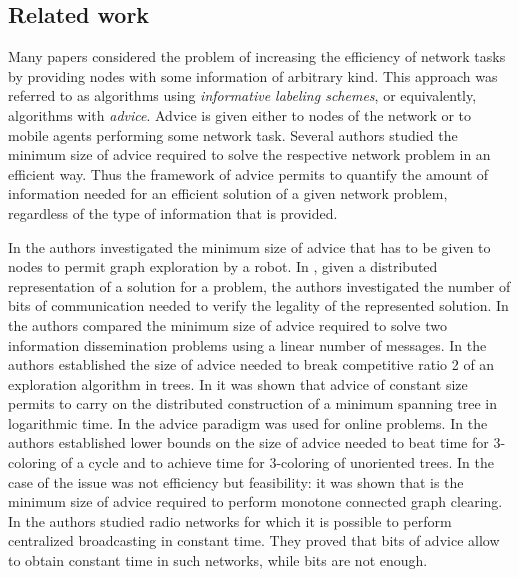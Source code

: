 \documentclass{article}
\begin{document}
\subsection{Related work}
{Many papers \cite{AKM01,CFP,CFIKP,DP,EFKR,FGIP,FIP1,FIP2,FKL,FP,GPPR02,IKP,KKKP02,KKP05,SN,TZ05} considered the problem of increasing the efficiency of network tasks by providing nodes with some information of arbitrary kind.}
This approach was referred to as
algorithms using {\em informative labeling schemes}, or equivalently, algorithms with {\em advice}.  
Advice is given either to nodes of the network or to mobile agents performing some network task.
Several authors studied the minimum size of advice required to solve the
respective network problem in an efficient way. Thus the framework of advice permits to quantify the amount of information
needed for an efficient solution of a given network problem, regardless of the type of information that is provided.

In \cite{CFIKP} the authors investigated the minimum size of advice that has to be given to nodes
to permit graph exploration by a robot. 
 In \cite{KKP05}, given a distributed representation of a solution for a problem,
the authors investigated the number of bits of communication needed to verify the legality of the represented solution.
In \cite{FIP1} the authors compared the minimum size of advice required to
solve two information dissemination problems using a linear number of messages. In \cite{FIP2} the authors
established the size of advice needed to break competitive ratio 2 of an exploration algorithm in trees.
In \cite{FKL} it was shown that advice of constant size permits to carry on the distributed construction of a minimum
spanning tree in logarithmic time. 
In \cite{EFKR} the advice paradigm was used for online problems.
In \cite{FGIP} the authors established lower bounds on the size of advice 
needed to beat time 
for 3-coloring of a cycle and to achieve time  for 3-coloring of unoriented trees.  
In the case of \cite{SN} the issue was not efficiency but feasibility: it
was shown that  is the minimum size of advice
required to perform monotone connected graph clearing.
In \cite{IKP} the authors studied radio networks for
which it is possible to perform centralized broadcasting in constant time. They proved that
 bits of advice allow to obtain constant time in such networks, while
 bits are not enough. 
\end{document}
